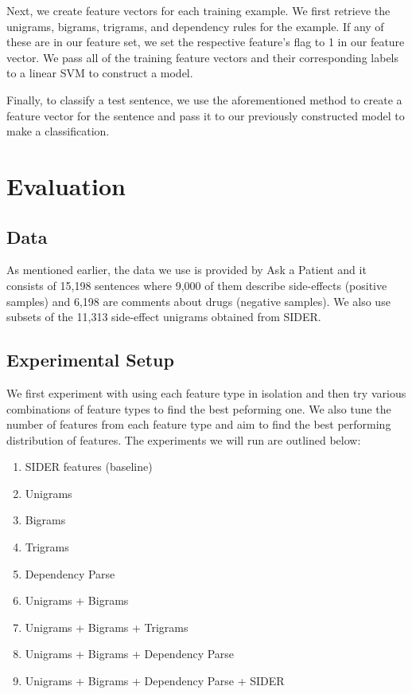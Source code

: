 \documentclass{acm_proc_article-sp}
\begin{document}
Next, we create feature vectors for each training example. We first retrieve the unigrams, bigrams, trigrams, and dependency rules for the example. If any of these are in our feature set, we set the respective feature's flag to 1 in our feature vector. We pass all of the training feature vectors and their corresponding labels to a linear SVM to construct a model.

Finally, to classify a test sentence, we use the aforementioned method to create a feature vector for the sentence and pass it to our previously constructed model to make a classification. 

\section{Evaluation}
\vspace{2mm}
\subsection{Data}
As mentioned earlier, the data we use is provided by Ask a Patient and it consists of 15,198 sentences where 9,000 of them describe side-effects (positive samples) and 6,198 are comments about drugs (negative samples). We also use subsets of the 11,313 side-effect unigrams obtained from SIDER.

\subsection{Experimental Setup}
We first experiment with using each feature type in isolation and then try various combinations of feature types to find the best peforming one. We also tune the number of features from each feature type and aim to find the best performing distribution of features. The experiments we will run are outlined below:
\vspace{-3mm}
\begin{enumerate}
\setlength\itemsep{0.2em}
\item SIDER features (baseline)
\item Unigrams
\item Bigrams
\item Trigrams
\item Dependency Parse 
\item Unigrams + Bigrams
\item Unigrams + Bigrams + Trigrams
\item Unigrams + Bigrams + Dependency Parse
\item Unigrams + Bigrams + Dependency Parse + SIDER
\end{enumerate}
\end{document}

